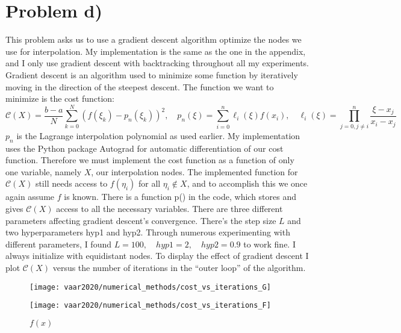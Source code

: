 \section{Problem d)}
This problem asks us to use a gradient descent algorithm optimize the nodes we use for interpolation. My implementation is the same as the one in the appendix, and I only use gradient descent with backtracking throughout all my experiments.
\newline Gradient descent is an algorithm used to minimize some function by iteratively moving in the direction of the steepest descent. The function we want to minimize is the cost function:
$$ \mathcal{C}(X)=\frac{b-a}{N}\sum_{k=0}^{N}\left(f(\xi_k)-p_n(\xi_k)\right)^2 ,\quad p_{n}(\xi)=\sum_{i=0}^{n} \ell_{i}(\xi) f\left(x_{i}\right), \quad \ell_{i}(\xi)=\prod_{j=0, j \neq i}^{n} \frac{\xi-x_{j}}{x_{i}-x_{j}}$$
$p_n$ is the Lagrange interpolation polynomial as used earlier. My implementation uses the Python package Autograd for automatic differentiation of our cost function. Therefore we must implement the cost function as a function of only one variable, namely $X$, our interpolation nodes. The implemented function for $\mathcal{C}(X)$ still needs access to $f(\eta_i)$ for all $\eta_i\notin X$, and to accomplish this we once again assume $f$ is known. There is a function p() in the code, which stores and gives $\mathcal{C}(X)$ access to all the necessary variables.
\newline There are three different parameters affecting gradient descent's convergence. There's the step size $L$ and two hyperparameters hyp1 and hyp2. Through numerous experimenting with different parameters, I found $L=100, \quad hyp1=2, \quad hyp2=0.9$ to work fine. I always initialize with equidistant nodes. To display the effect of gradient descent I plot $\mathcal{C}(X)$ versus the number of iterations in the ``outer loop'' of the algorithm.
\begin{figure}[H]
    \centering
    \begin{minipage}{0.45\textwidth}
        \centering
        \texttt{[image: vaar2020/numerical\_methods/cost\_vs\_iterations\_G]} %
        \caption{$g(x)$}
    \end{minipage}\hfill
    \begin{minipage}{0.45\textwidth}
        \centering
        \texttt{[image: vaar2020/numerical\_methods/cost\_vs\_iterations\_F]} %
        \caption{$f(x)$}
    \end{minipage}
\end{figure}
